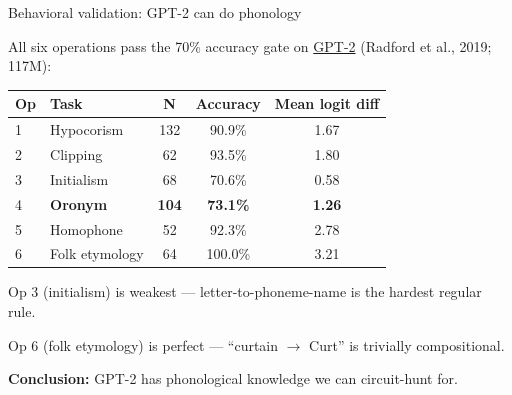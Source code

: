 \documentclass[10pt,aspectratio=169]{beamer}
\begin{document}
\begin{frame}{Behavioral validation: GPT-2 can do phonology}
\hypertarget{sl:behavioral}{}

All six operations pass the 70\% accuracy gate on \href{https://cdn.openai.com/better-language-models/language_models_are_unsupervised_multitask_learners.pdf}{GPT-2} (Radford et al., 2019; 117M):

\vspace{0.5em}
\begin{center}
\small
\renewcommand{\arraystretch}{1.2}
\begin{tabular}{llccc}
\toprule
\textbf{Op} & \textbf{Task} & \textbf{N} & \textbf{Accuracy} & \textbf{Mean logit diff} \\
\midrule
1 & Hypocorism & 132 & 90.9\% & 1.67 \\
2 & Clipping & 62 & 93.5\% & 1.80 \\
3 & Initialism & 68 & 70.6\% & 0.58 \\
\rowcolor{fusion!8}
4 & \textbf{Oronym} & \textbf{104} & \textbf{73.1\%} & \textbf{1.26} \\
5 & Homophone & 52 & 92.3\% & 2.78 \\
6 & Folk etymology & 64 & 100.0\% & 3.21 \\
\bottomrule
\end{tabular}
\end{center}

\vspace{0.5em}
Op 3 (initialism) is weakest --- letter-to-phoneme-name is the hardest regular rule.

Op 6 (folk etymology) is perfect --- ``curtain $\to$ Curt'' is trivially compositional.

\textbf{Conclusion:} GPT-2 has phonological knowledge we can circuit-hunt for.
\end{frame}
\end{document}
